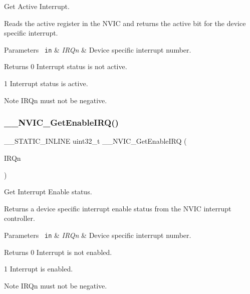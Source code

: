 Get Active Interrupt. 

Reads the active register in the N\+V\+IC and returns the active bit for the device specific interrupt. 
\begin{DoxyParams}[1]{Parameters}
\mbox{\texttt{ in}}  & {\em I\+R\+Qn} & Device specific interrupt number. \\
\hline
\end{DoxyParams}
\begin{DoxyReturn}{Returns}
0 Interrupt status is not active. 

1 Interrupt status is active. 
\end{DoxyReturn}
\begin{DoxyNote}{Note}
I\+R\+Qn must not be negative. 
\end{DoxyNote}
\mbox{\label{group___c_m_s_i_s___core___n_v_i_c_functions_gaaeb5e7cc0eaad4e2817272e7bf742083}} 
\subsubsection{\texorpdfstring{\_\_NVIC\_GetEnableIRQ()}{\_\_NVIC\_GetEnableIRQ()}}
{\footnotesize\ttfamily \+\_\+\+\_\+\+S\+T\+A\+T\+I\+C\+\_\+\+I\+N\+L\+I\+NE uint32\+\_\+t \+\_\+\+\_\+\+N\+V\+I\+C\+\_\+\+Get\+Enable\+I\+RQ (\begin{DoxyParamCaption}\item[{I\+R\+Qn\+\_\+\+Type}]{I\+R\+Qn }\end{DoxyParamCaption})}



Get Interrupt Enable status. 

Returns a device specific interrupt enable status from the N\+V\+IC interrupt controller. 
\begin{DoxyParams}[1]{Parameters}
\mbox{\texttt{ in}}  & {\em I\+R\+Qn} & Device specific interrupt number. \\
\hline
\end{DoxyParams}
\begin{DoxyReturn}{Returns}
0 Interrupt is not enabled. 

1 Interrupt is enabled. 
\end{DoxyReturn}
\begin{DoxyNote}{Note}
I\+R\+Qn must not be negative. 
\end{DoxyNote}
\mbox{\label{group___c_m_s_i_s___core___n_v_i_c_functions_ga5a92ca5fa801ad7adb92be7257ab9694}} 
